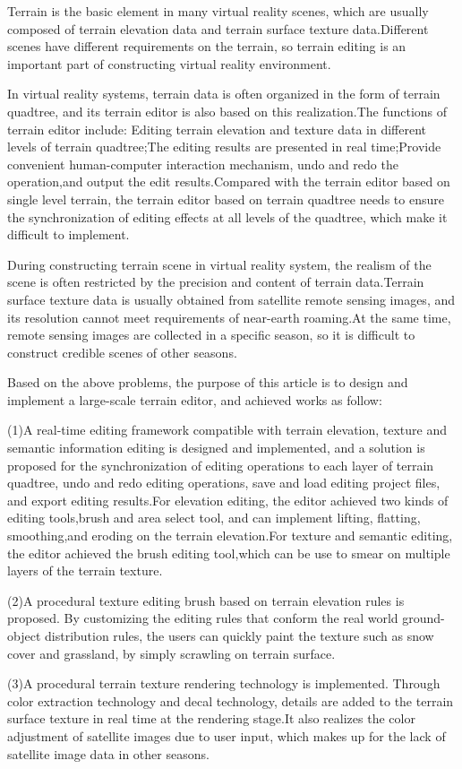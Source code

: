 \begin{eabstract}
Terrain is the basic element in many virtual reality scenes, which are usually composed of terrain elevation data and terrain surface texture data.Different scenes have different requirements on the terrain, so terrain editing is an important part of constructing virtual reality environment.\par
In virtual reality systems, terrain data is often organized in the form of terrain quadtree, and its terrain editor is also based on this realization.The functions of terrain editor include: Editing terrain elevation and texture data in different levels of terrain quadtree;The editing results are presented in real time;Provide convenient human-computer interaction mechanism, undo and redo the operation,and output the edit results.Compared with the terrain editor based on single level terrain, the terrain editor based on terrain quadtree needs to ensure the synchronization of editing effects at all levels of the quadtree, which make it difficult to implement.\par
During constructing terrain scene in virtual reality system, the realism of the scene is often restricted by the precision and content of terrain data.Terrain surface texture data is usually obtained from satellite remote sensing images, and its resolution cannot meet requirements of near-earth roaming.At the same time, remote sensing images are collected in a specific season, so it is difficult to construct credible scenes of other seasons.\par
Based on the above problems, the purpose of this article is to design and implement a large-scale terrain editor, and achieved works as follow:\par
(1)A real-time editing framework compatible with terrain elevation, texture and semantic information editing is designed and implemented, and a solution is proposed for the synchronization of editing operations to each layer of terrain quadtree, undo and redo editing operations, save and load editing project files, and export editing results.For elevation editing, the editor achieved two kinds of editing tools,brush and area select tool, and can implement  lifting, flatting, smoothing,and eroding on the terrain elevation.For texture and semantic editing, the editor achieved the brush editing tool,which can be use to smear on multiple layers of the terrain texture.\par
(2)A procedural texture editing brush based on terrain elevation rules is proposed. By customizing the editing rules that conform the real world ground-object distribution rules, the users can quickly paint the texture such as snow cover and grassland, by simply scrawling on terrain surface.\par
(3)A procedural terrain texture rendering technology is implemented. Through color extraction technology and decal technology, details are added to the terrain surface texture in real time at the rendering stage.It also realizes the color adjustment of satellite images due to user input, which makes up for the lack of satellite image data in other seasons.
\end{eabstract}

